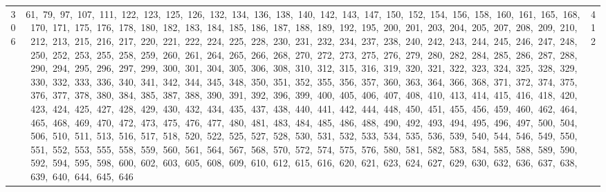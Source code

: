 \begin{longtable}{c|p{}|r}
306 & 61,\ 79,\ 97,\ 107,\ 111,\ 122,\ 123,\ 125,\ 126,\ 132,\ 134,\ 136,\ 138,\ 140,\ 142,\ 143,\ 147,\ 150,\ 152,\ 154,\ 156,\ 158,\ 160,\ 161,\ 165,\ 168,\ 170,\ 171,\ 175,\ 176,\ 178,\ 180,\ 182,\ 183,\ 184,\ 185,\ 186,\ 187,\ 188,\ 189,\ 192,\ 195,\ 200,\ 201,\ 203,\ 204,\ 205,\ 207,\ 208,\ 209,\ 210,\ 212,\ 213,\ 215,\ 216,\ 217,\ 220,\ 221,\ 222,\ 224,\ 225,\ 228,\ 230,\ 231,\ 232,\ 234,\ 237,\ 238,\ 240,\ 242,\ 243,\ 244,\ 245,\ 246,\ 247,\ 248,\ 250,\ 252,\ 253,\ 255,\ 258,\ 259,\ 260,\ 261,\ 264,\ 265,\ 266,\ 268,\ 270,\ 272,\ 273,\ 275,\ 276,\ 279,\ 280,\ 282,\ 284,\ 285,\ 286,\ 287,\ 288,\ 290,\ 294,\ 295,\ 296,\ 297,\ 299,\ 300,\ 301,\ 304,\ 305,\ 306,\ 308,\ 310,\ 312,\ 315,\ 316,\ 319,\ 320,\ 321,\ 322,\ 323,\ 324,\ 325,\ 328,\ 329,\ 330,\ 332,\ 333,\ 336,\ 340,\ 341,\ 342,\ 344,\ 345,\ 348,\ 350,\ 351,\ 352,\ 355,\ 356,\ 357,\ 360,\ 363,\ 364,\ 366,\ 368,\ 371,\ 372,\ 374,\ 375,\ 376,\ 377,\ 378,\ 380,\ 384,\ 385,\ 387,\ 388,\ 390,\ 391,\ 392,\ 396,\ 399,\ 400,\ 405,\ 406,\ 407,\ 408,\ 410,\ 413,\ 414,\ 415,\ 416,\ 418,\ 420,\ 423,\ 424,\ 425,\ 427,\ 428,\ 429,\ 430,\ 432,\ 434,\ 435,\ 437,\ 438,\ 440,\ 441,\ 442,\ 444,\ 448,\ 450,\ 451,\ 455,\ 456,\ 459,\ 460,\ 462,\ 464,\ 465,\ 468,\ 469,\ 470,\ 472,\ 473,\ 475,\ 476,\ 477,\ 480,\ 481,\ 483,\ 484,\ 485,\ 486,\ 488,\ 490,\ 492,\ 493,\ 494,\ 495,\ 496,\ 497,\ 500,\ 504,\ 506,\ 510,\ 511,\ 513,\ 516,\ 517,\ 518,\ 520,\ 522,\ 525,\ 527,\ 528,\ 530,\ 531,\ 532,\ 533,\ 534,\ 535,\ 536,\ 539,\ 540,\ 544,\ 546,\ 549,\ 550,\ 551,\ 552,\ 553,\ 555,\ 558,\ 559,\ 560,\ 561,\ 564,\ 567,\ 568,\ 570,\ 572,\ 574,\ 575,\ 576,\ 580,\ 581,\ 582,\ 583,\ 584,\ 585,\ 588,\ 589,\ 590,\ 592,\ 594,\ 595,\ 598,\ 600,\ 602,\ 603,\ 605,\ 608,\ 609,\ 610,\ 612,\ 615,\ 616,\ 620,\ 621,\ 623,\ 624,\ 627,\ 629,\ 630,\ 632,\ 636,\ 637,\ 638,\ 639,\ 640,\ 644,\ 645,\ 646 & 412 \\

\end{longtable}
